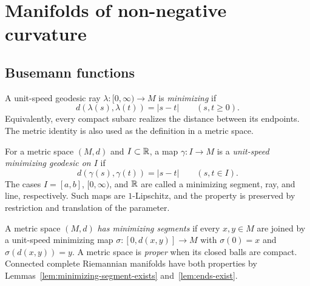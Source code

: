 \chapter{Manifolds of non-negative curvature}
\label{chap:manifolds-nonneg-curvature}
\label{nonnegcurv}

\section{Busemann functions}

\begin{definition}
\label{def:minimizing-geodesic-ray}






A unit-speed geodesic ray $\lambda\colon[0,\infty)\to M$ is
\emph{minimizing} if
$$d(\lambda(s),\lambda(t))=|s-t|\qquad(s,t\ge0).$$
Equivalently, every compact subarc realizes the distance between its
endpoints. The metric identity is also used as the definition in a metric
space.
\end{definition}

\begin{definition}
\label{def:minimizing-geodesic-window}






For a metric space $(M,d)$ and $I\subset\mathbb{R}$, a map $\gamma\colon I\to M$
is a \emph{unit-speed minimizing geodesic on $I$} if
$$d(\gamma(s),\gamma(t))=|s-t|\qquad(s,t\in I).$$
The cases $I=[a,b]$, $[0,\infty)$, and $\mathbb{R}$ are called a minimizing
segment, ray, and line, respectively. Such maps are $1$-Lipschitz, and the
property is preserved by restriction and translation of the parameter.
\end{definition}

\begin{definition}
\label{def:has-min-segments}





A metric space $(M,d)$ \emph{has minimizing segments} if every $x,y\in M$
are joined by a unit-speed minimizing map
$\sigma\colon[0,d(x,y)]\to M$ with $\sigma(0)=x$ and
$\sigma(d(x,y))=y$. A metric space is \emph{proper} when its
closed balls are compact. Connected complete Riemannian manifolds have both
properties by Lemmas~\ref{lem:minimizing-segment-exists}
and~\ref{lem:ends-exist}.
\end{definition}

